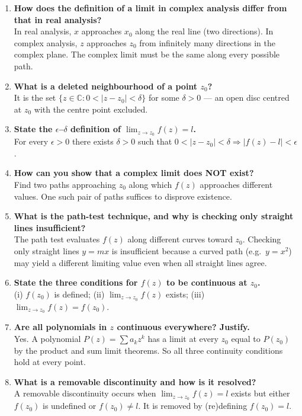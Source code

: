 \documentclass[12pt,a4paper]{article}
\begin{document}
\begin{enumerate}[leftmargin=*, label=\textbf{Q\arabic*.}]

\item \textbf{How does the definition of a limit in complex analysis differ from that in real analysis?}\\
In real analysis, $x$ approaches $x_0$ along the real line (two directions).
In complex analysis, $z$ approaches $z_0$ from infinitely many directions in the
complex plane.  The complex limit must be the same along every possible path.

\item \textbf{What is a deleted neighbourhood of a point $z_0$?}\\
It is the set $\{z \in \mathbb{C} : 0 < |z - z_0| < \delta\}$ for some $\delta > 0$
--- an open disc centred at $z_0$ with the centre point excluded.

\item \textbf{State the $\epsilon$--$\delta$ definition of $\lim_{z \to z_0} f(z) = l$.}\\
For every $\epsilon > 0$ there exists $\delta > 0$ such that
$0 < |z - z_0| < \delta \Rightarrow |f(z) - l| < \epsilon$.

\item \textbf{How can you show that a complex limit does NOT exist?}\\
Find two paths approaching $z_0$ along which $f(z)$ approaches different values.
One such pair of paths suffices to disprove existence.

\item \textbf{What is the path-test technique, and why is checking only straight lines insufficient?}\\
The path test evaluates $f(z)$ along different curves toward $z_0$.
Checking only straight lines $y = mx$ is insufficient because a curved path
(e.g.\ $y = x^2$) may yield a different limiting value even when all straight
lines agree.

\item \textbf{State the three conditions for $f(z)$ to be continuous at $z_0$.}\\
(i) $f(z_0)$ is defined; (ii) $\lim_{z \to z_0}f(z)$ exists;
(iii) $\lim_{z \to z_0}f(z) = f(z_0)$.

\item \textbf{Are all polynomials in $z$ continuous everywhere?  Justify.}\\
Yes.  A polynomial $P(z) = \sum a_k z^k$ has a limit at every $z_0$ equal to
$P(z_0)$ by the product and sum limit theorems.  So all three continuity
conditions hold at every point.

\item \textbf{What is a removable discontinuity and how is it resolved?}\\
A removable discontinuity occurs when $\lim_{z \to z_0}f(z) = l$ exists but
either $f(z_0)$ is undefined or $f(z_0) \neq l$.
It is removed by (re)defining $f(z_0) = l$.

\end{enumerate}
\end{document}
